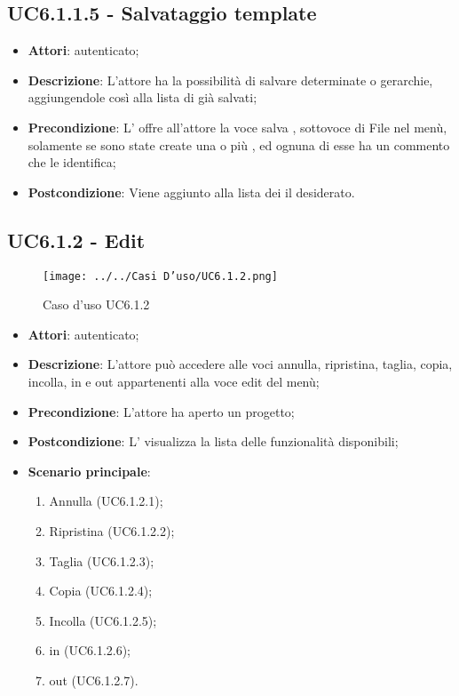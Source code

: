 \subsection{UC6.1.1.5 - Salvataggio template}
\label{ssec:UC6.1.1.5}
\begin{itemize}
\item \textbf{Attori}:  autenticato;
\item \textbf{Descrizione}: L’attore ha la possibilità di salvare determinate  o gerarchie, aggiungendole così alla lista di  già salvati;
\item \textbf{Precondizione}: L’ offre all’attore la voce salva , sottovoce di File nel menù, solamente se sono state create una o più , ed ognuna di esse ha un commento che le identifica;
\item \textbf{Postcondizione}: Viene aggiunto alla lista dei  il  desiderato.
\end{itemize}
\newpage
\subsection{UC6.1.2 - Edit}
\label{ssec:UC6.1.2}
\begin{figure}[h!]
\centering
\texttt{[image: ../../Casi D'uso/UC6.1.2.png]}
\caption{Caso d'uso UC6.1.2}
 \end{figure}
\begin{itemize}
\item \textbf{Attori}:  autenticato;
\item \textbf{Descrizione}: L’attore può accedere alle voci annulla, ripristina, taglia, copia, incolla,  in e  out appartenenti alla voce edit del menù;
\item \textbf{Precondizione}: L'attore ha aperto un progetto;
\item \textbf{Postcondizione}: L’ visualizza la lista delle funzionalità disponibili;
\item \textbf{Scenario principale}: \begin{enumerate}\item Annulla (UC6.1.2.1);\item Ripristina (UC6.1.2.2);\item Taglia (UC6.1.2.3);\item Copia (UC6.1.2.4);\item Incolla (UC6.1.2.5);\item {} in (UC6.1.2.6);\item {} out (UC6.1.2.7).
 \end{enumerate}
\end{itemize}
